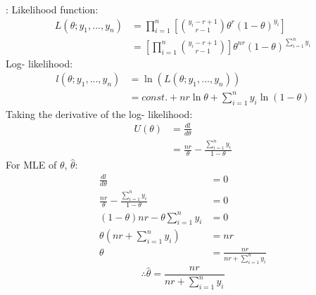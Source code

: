 \documentclass[a4paper]{article}
\begin{document}
        \newpage
        [2]: \newline
        Likelihood function:
            \begin{equation*}
                \begin{split}
                    L(\theta;y_1, ... ,y_n) &= \prod_{i=1}^n \left[{{y_i-r+1}\choose{r-1}} \theta^r (1-\theta)^{y_i}\right]\\
                    &= \left[\prod_{i=1}^n {{y_i-r+1}\choose{r-1}}\right] \theta^{nr} (1-\theta)^{\sum_{i=1}^n y_i}
                \end{split}
            \end{equation*}
        Log- likelihood:
            \begin{equation*}
                \begin{split}
                    l(\theta; y_1, ..., y_n) &= \ln(L(\theta;y_1, ..., y_n))\\
                    &= const. + nr\ln\theta + \sum_{i=1}^n y_i \ln(1-\theta)
                \end{split}
            \end{equation*}
        Taking the derivative of the log- likelihood:
            \begin{equation}
                \begin{split}
                    U(\theta) &= \frac{dl}{d\theta}\\
                    &= \frac{nr}{\theta} - \frac{\sum_{i=1}^n y_i}{1-\theta}
                \end{split}
            \end{equation}
        For MLE of \(\theta\), \(\hat{\theta}\):
            \begin{equation*}
                \begin{split}
                    \frac{dl}{d\theta} &= 0\\
                    \frac{nr}{\theta} - \frac{\sum_{i=1}^n y_i}{1-\theta} &= 0\\
                    (1-\theta)nr - \theta\sum_{i=1}^n y_i &= 0\\
                    \theta\left(nr+\sum_{i=1}^n y_i\right) &= nr\\
                    \theta &= \frac{nr}{nr+\sum_{i=1}^n y_i}
                \end{split}
            \end{equation*}
		\[\therefore \hat{\theta}=\frac{nr}{nr+\sum_{i=1}^n y_i}\]
	
	\newpage
\end{document}
